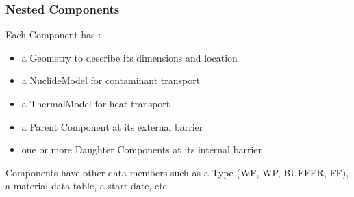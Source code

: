 \begin{frame}
  \frametitle{Nested Components}
  Each Component has : 
  \begin{itemize}
    \item a Geometry to describe its dimensions and location
    \item a NuclideModel for contaminant transport 
    \item a ThermalModel for heat transport
    \item a Parent Component at its external barrier
    \item one or more Daughter Components at its internal barrier
  \end{itemize}

  Components have other data members such as a Type (WF, WP, BUFFER, FF), a 
  material data table, a start date, etc. 
\end{frame}

